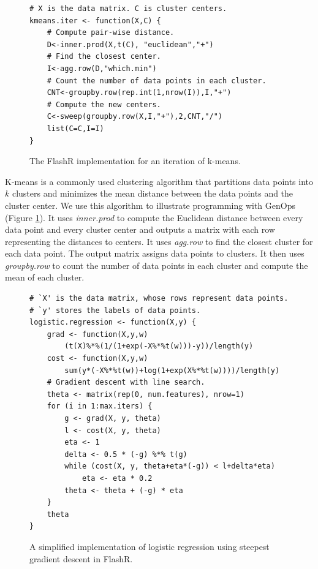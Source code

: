 \begin{figure}
\centering
\begin{verbatim}
# X is the data matrix. C is cluster centers.
kmeans.iter <- function(X,C) {
	# Compute pair-wise distance.
	D<-inner.prod(X,t(C), "euclidean","+")
	# Find the closest center.
	I<-agg.row(D,"which.min")
	# Count the number of data points in each cluster.
	CNT<-groupby.row(rep.int(1,nrow(I)),I,"+")
	# Compute the new centers.
	C<-sweep(groupby.row(X,I,"+"),2,CNT,"/")
	list(C=C,I=I)
}
\end{verbatim}
\vspace{-10pt}
	\caption{The FlashR implementation for an iteration of k-means.}
	\label{fig:kmeans}
\vspace{-10pt}
\end{figure}

K-means is a commonly used clustering algorithm that partitions data points
into $k$ clusters and minimizes the mean distance between the data points and
the cluster center. We use this algorithm to illustrate programming with GenOps
(Figure \ref{fig:kmeans}). It uses \textit{inner.prod} to
compute the Euclidean distance between every data point and every cluster center
and outputs a matrix with each row representing the distances to centers.  
It uses \textit{agg.row} to find the closest
cluster for each data point.  The output matrix 
assigns data points to clusters. It then uses \textit{groupby.row} to count
the number of data points in each cluster and compute the mean of each cluster.

\begin{figure}
\begin{verbatim}
# `X' is the data matrix, whose rows represent data points.
# `y' stores the labels of data points.
logistic.regression <- function(X,y) {
	grad <- function(X,y,w)
		(t(X)%*%(1/(1+exp(-X%*%t(w)))-y))/length(y)
	cost <- function(X,y,w)
		sum(y*(-X%*%t(w))+log(1+exp(X%*%t(w))))/length(y)
	# Gradient descent with line search.
	theta <- matrix(rep(0, num.features), nrow=1)
	for (i in 1:max.iters) {
		g <- grad(X, y, theta)
		l <- cost(X, y, theta)
		eta <- 1
		delta <- 0.5 * (-g) %*% t(g)
		while (cost(X, y, theta+eta*(-g)) < l+delta*eta)
			eta <- eta * 0.2
		theta <- theta + (-g) * eta
	}
	theta
}
\end{verbatim}
\vspace{-10pt}
\caption{A simplified implementation of logistic regression using
steepest gradient descent in FlashR.}
\label{logistic}
\vspace{-5pt}
\end{figure}


